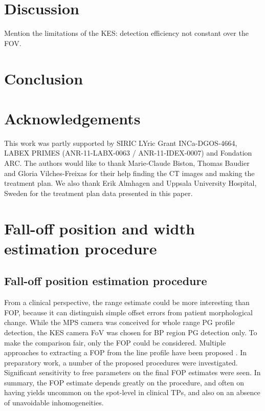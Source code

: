 \documentclass[a4paper,english]{article}
\begin{document}
\section{Discussion}

Mention the limitations of the KES: detection efficiency not constant over the FOV.


\section{Conclusion}


\section{Acknowledgements}

This work was partly supported by SIRIC LYric Grant INCa-DGOS-4664, LABEX PRIMES (ANR-11-LABX-0063 / ANR-11-IDEX-0007) and Fondation ARC. The authors would like to thank Marie-Claude Biston, Thomas Baudier and Gloria Vilches-Freixas for their help finding the CT images and making the treatment plan. We also thank Erik Almhagen and Uppsala University Hospital, Sweden for the treatment plan data presented in this paper.

\newpage

\appendix
% 

\section{Fall-off position and width estimation procedure}\label{sec:fopproc}

\subsection{Fall-off position estimation procedure}

From a clinical perspective, the range estimate could be more interesting than FOP, because it can distinguish simple offset errors from patient morphological change. While the MPS camera was conceived for whole range PG profile detection, the KES camera FoV was chosen for BP region PG detection only. To make the comparison fair, only the FOP could be considered. Multiple approaches to extracting a FOP from the line profile have been proposed \citep{Smeets2012,Gueth2013,Roellinghoff2014a,Janssen2014,Sterpin2015}. In preparatory work, a number of the proposed procedures were investigated. Significant sensitivity to free parameters on the final FOP estimates were seen. In summary, the FOP estimate depends greatly on the procedure, and often on having yields uncommon on the spot-level in clinical TPs, and also on an absence of unavoidable inhomogeneities.
\end{document}
